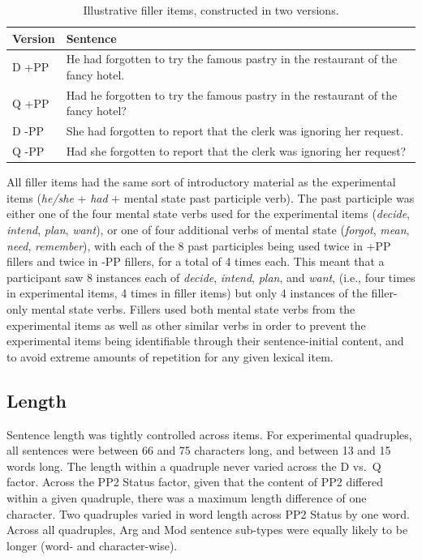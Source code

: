 \documentclass[11pt,oneside]{book}
\begin{document}
\begin{table}[!h]

\caption{\label{tab:fsentences}Illustrative filler items, constructed in two versions.}
\centering
\begin{tabular}{ll}
\toprule
Version & Sentence\\
\midrule
D +PP & He had forgotten to try the famous pastry in the restaurant of the fancy hotel.\\
Q +PP & Had he forgotten to try the famous pastry in the restaurant of the fancy hotel?\\
\hline
\addlinespace
D -PP & She had forgotten to report that the clerk was ignoring her request.\\
Q -PP & Had she forgotten to report that the clerk was ignoring her request?\\
\bottomrule
\end{tabular}
\end{table}

All filler items had the same sort of introductory material as the experimental items (\emph{he/she} + \emph{had} + mental state past participle verb). The past participle was either one of the four mental state verbs used for the experimental items (\emph{decide}, \emph{intend}, \emph{plan}, \emph{want}), or one of four additional verbs of mental state (\emph{forgot}, \emph{mean}, \emph{need}, \emph{remember}), with each of the 8 past participles being used twice in +PP fillers and twice in -PP fillers, for a total of 4 times each. This meant that a participant saw 8 instances each of \emph{decide}, \emph{intend}, \emph{plan}, and \emph{want}, (i.e., four times in experimental items, 4 times in filler items) but only 4 instances of the filler-only mental state verbs. Fillers used both mental state verbs from the experimental items as well as other similar verbs in order to prevent the experimental items being identifiable through their sentence-initial content, and to avoid extreme amounts of repetition for any given lexical item.

\hypertarget{length}{%
\subsection{Length}\label{length}}

Sentence length was tightly controlled across items. For experimental quadruples, all sentences were between 66 and 75 characters long, and between 13 and 15 words long. The length within a quadruple never varied across the D vs.~Q factor. Across the PP2 Status factor, given that the content of PP2 differed within a given quadruple, there was a maximum length difference of one character. Two quadruples varied in word length across PP2 Status by one word. Across all quadruples, Arg and Mod sentence sub-types were equally likely to be longer (word- and character-wise).
\end{document}
